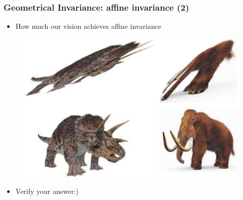 \begin{frame}
\frametitle {Geometrical Invariance: affine invariance (2)}
\begin{itemize}
	\item {How much our vision achieves affine invariance}
\end{itemize}
\begin{figure}
	{\includegraphics[width=0.75\linewidth]{./figs/invariance_affine2.pdf}}
\end{figure}
\begin{itemize}
	\item {Verify your answer:)}
\end{itemize}
\end{frame}